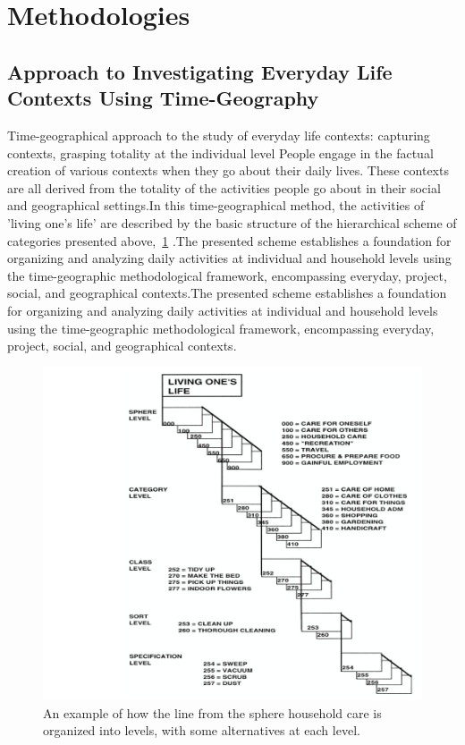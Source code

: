 \documentclass{chart}
\begin{document}
\newpage
 \vspace*{0.5cm}
\section{Methodologies} 
\subsection{Approach to Investigating Everyday Life Contexts Using Time-Geography} 
\hspace{1cm}Time-geographical approach to the study of everyday life contexts: capturing contexts, grasping totality at the individual level People engage in the factual creation of various contexts when they go about their daily lives. These contexts are all derived from the totality of the activities people go about in their social and geographical settings.In this time-geographical method, the activities of
'living one's life' are described by the basic structure of the hierarchical scheme of categories presented above,~\cref{fig:Activity categorization scheme.} .The presented scheme establishes a foundation for organizing and analyzing daily activities at individual and household levels using the time-geographic methodological framework, encompassing everyday, project, social, and geographical contexts.The presented scheme establishes a foundation for organizing and analyzing daily activities at individual and household levels using the time-geographic methodological framework, encompassing everyday, project, social, and geographical contexts.\\
\begin{figure}
	\centering
	\includegraphics[width=0.45\linewidth]{fig3}
	\caption{An example of how the line from the sphere household care is organized into levels, with some alternatives at each level.} 
	\label{fig:Activity categorization scheme.}
\end{figure}
\end{document}
